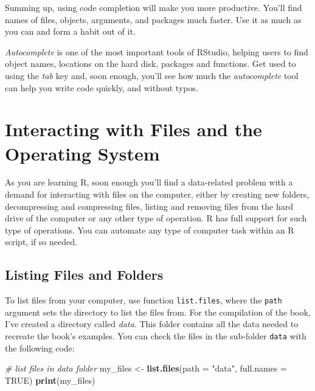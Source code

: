 \documentclass[
  12pt,
]{book}
\newenvironment{Shaded}{\begin{snugshade}}{\end{snugshade}}
\newcommand{\CommentTok}[1]{\textcolor[rgb]{0.37,0.37,0.37}{\textit{#1}}}
\newcommand{\DataTypeTok}[1]{\textcolor[rgb]{0.27,0.27,0.27}{#1}}
\newcommand{\KeywordTok}[1]{\textcolor[rgb]{0.27,0.27,0.27}{\textbf{#1}}}
\newcommand{\NormalTok}[1]{#1}
\newcommand{\OtherTok}[1]{\textcolor[rgb]{0.37,0.37,0.37}{#1}}
\newcommand{\StringTok}[1]{\textcolor[rgb]{0.5,0.5,0.5}{#1}}
\newenvironment{rmdimportant}
{\begin{importantblock}
		
	} {\end{importantblock}}
\begin{document}
Summing up, using code completion will make you more productive. You'll find names of files, objects, arguments, and packages much faster. Use it as much as you can and form a habit out of it.

\begin{rmdimportant}
\emph{Autocomplete} is one of the most important tools of RStudio,
helping users to find object names, locations on the hard disk, packages
and functions. Get used to using the \emph{tab} key and, soon enough,
you'll see how much the \emph{autocomplete} tool can help you write code
quickly, and without typos.
\end{rmdimportant}

\hypertarget{interacting-with-files-and-the-operating-system}{%
\section{Interacting with Files and the Operating System}\label{interacting-with-files-and-the-operating-system}}

As you are learning R, soon enough you'll find a data-related problem with a demand for interacting with files on the computer, either by creating new folders, decompressing and compressing files, listing and removing files from the hard drive of the computer or any other type of operation. R has full support for such type of operations. You can automate any type of computer task within an R script, if so needed.

\hypertarget{listing-files-and-folders}{%
\subsection{Listing Files and Folders}\label{listing-files-and-folders}}

To list files from your computer, use function \texttt{list.files}, where the \texttt{path} argument sets the directory to list the files from. For the compilation of the book, I've created a directory called \emph{data}. This folder contains all the data needed to recreate the book's examples. You can check the files in the sub-folder \texttt{data} with the following code: 

\begin{Shaded}
\begin{Highlighting}[]
\CommentTok{# list files in data folder}
\NormalTok{my_files <-}\StringTok{ }\KeywordTok{list.files}\NormalTok{(}\DataTypeTok{path =} \StringTok{"data"}\NormalTok{, }\DataTypeTok{full.names =} \OtherTok{TRUE}\NormalTok{)}
\KeywordTok{print}\NormalTok{(my_files)}
\end{Highlighting}
\end{Shaded}
\end{document}
